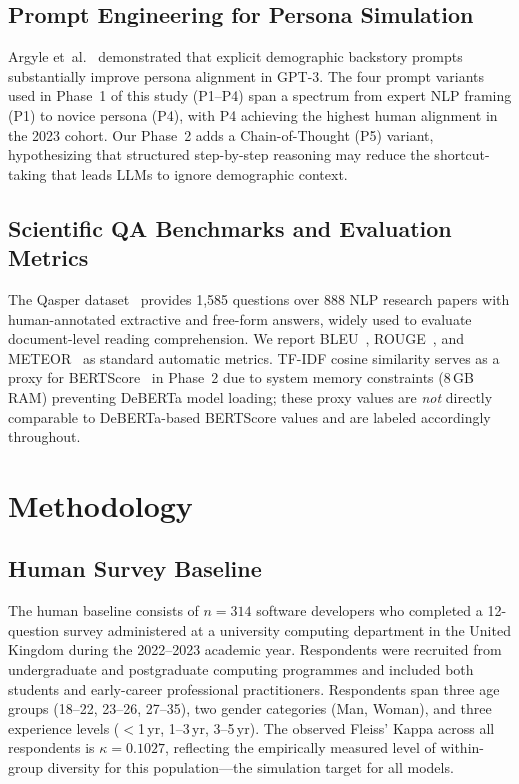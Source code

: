 \documentclass[sigconf,nonacm]{acmart}
\begin{document}
\subsection{Prompt Engineering for Persona Simulation}
\label{sec:rw:prompt}

Argyle et~al.~\cite{argyle2023} demonstrated that explicit demographic
backstory prompts substantially improve persona alignment in GPT-3.
The four prompt variants used in Phase~1 of this study (P1--P4) span
a spectrum from expert NLP framing (P1) to novice persona (P4), with
P4 achieving the highest human alignment in the 2023 cohort.
Our Phase~2 adds a Chain-of-Thought (P5) variant, hypothesizing that
structured step-by-step reasoning may reduce the shortcut-taking that
leads LLMs to ignore demographic context.

\subsection{Scientific QA Benchmarks and Evaluation Metrics}
\label{sec:rw:metrics}

The Qasper dataset~\cite{dasigi2021} provides 1,585 questions over 888
NLP research papers with human-annotated extractive and free-form answers,
widely used to evaluate document-level reading comprehension.
We report BLEU~\cite{papineni2002}, ROUGE~\cite{lin2004}, and
METEOR~\cite{banerjee2005} as standard automatic metrics.
TF-IDF cosine similarity serves as a proxy for
BERTScore~\cite{zhang2019} in Phase~2 due to system memory constraints
(8\,GB RAM) preventing DeBERTa model loading; these proxy values are
\emph{not} directly comparable to DeBERTa-based BERTScore values and are
labeled accordingly throughout.

\section{Methodology}
\label{sec:method}

\subsection{Human Survey Baseline}
\label{sec:method:human}

The human baseline consists of $n{=}314$ software developers who completed
a 12-question survey administered at a university computing department in
the United Kingdom during the 2022--2023 academic year.
Respondents were recruited from undergraduate and postgraduate computing
programmes and included both students and early-career professional
practitioners.
Respondents span three age groups (18--22, 23--26, 27--35), two gender
categories (Man, Woman), and three experience levels ($<$1\,yr, 1--3\,yr,
3--5\,yr).
The observed Fleiss' Kappa across all respondents is $\kappa{=}0.1027$,
reflecting the empirically measured level of within-group diversity for
this population---the simulation target for all models.
\end{document}
